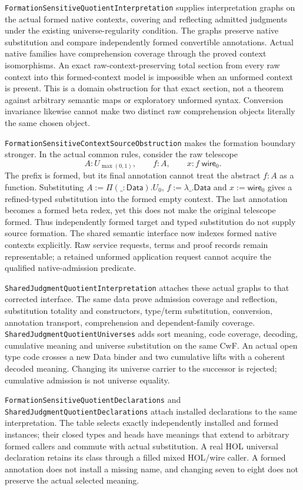 \documentclass[11pt]{article}
\theoremstyle{definition}
\theoremstyle{remark}
\begin{document}
\nolinkurl{FormationSensitiveQuotientInterpretation} supplies interpretation
graphs on the actual formed native contexts, covering and reflecting
admitted judgments under the existing universe-regularity condition.
The graphs preserve native substitution and compare independently formed
convertible annotations. Actual native families have comprehension coverage
through the proved context isomorphisms. An exact raw-context-preserving
total section from every raw context into this formed-context model is
impossible when an unformed context is present. This is a domain obstruction
for that exact section, not a theorem against arbitrary semantic maps or
exploratory unformed syntax. Conversion invariance likewise cannot make two
distinct raw comprehension objects literally the same chosen object.

\nolinkurl{FormationSensitiveContextSourceObstruction} makes the formation
boundary stronger. In the actual common rules, consider the raw telescope
\[
 A:U_{\max(0,1)},\qquad f:A,\qquad x:f\;\mathsf{wire}_0.
\]
The prefix is formed, but its final annotation cannot treat the abstract
$f:A$ as a function. Substituting
$A:=\Pi(\_:\mathsf{Data}).U_0$, $f:=\lambda\_.\mathsf{Data}$ and
$x:=\mathsf{wire}_0$ gives a refined-typed substitution into the formed empty
context. The last annotation becomes a formed beta redex, yet this does not
make the original telescope formed. Thus independently formed target and
typed substitution do not supply source formation. The shared semantic
interface now indexes formed native contexts explicitly. Raw service requests,
terms and proof records remain representable; a retained unformed application
request cannot acquire the qualified native-admission predicate.

\nolinkurl{SharedJudgmentQuotientInterpretation} attaches these actual graphs
to that corrected interface. The same data prove admission coverage and
reflection, substitution totality and constructors, type/term substitution,
conversion, annotation transport, comprehension and dependent-family coverage.
\nolinkurl{SharedJudgmentQuotientUniverses} adds sort meaning, code coverage,
decoding, cumulative meaning and universe substitution on the same CwF.
An actual open type code crosses a new Data binder and two cumulative lifts
with a coherent decoded meaning. Changing its universe carrier to the
successor is rejected; cumulative admission is not universe equality.

\nolinkurl{FormationSensitiveQuotientDeclarations} and
\nolinkurl{SharedJudgmentQuotientDeclarations} attach installed declarations
to the same interpretation. The table selects exactly independently installed
and formed instances; their closed types and heads have meanings that extend
to arbitrary formed callers and commute with actual substitution. A real HOL
universal declaration retains its class through a filled mixed HOL/wire caller.
A formed annotation does not install a missing name, and changing seven to
eight does not preserve the actual selected meaning.
\end{document}
